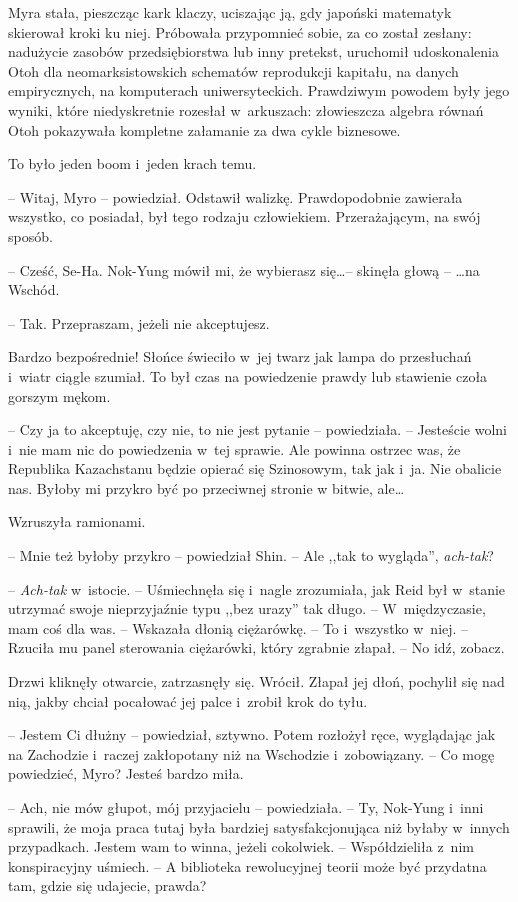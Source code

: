 \documentclass[oneside,polish,11pt,sfheadings]{mwbk}
\begin{document}
Myra stała, pieszcząc kark klaczy, uciszając ją, gdy japoński matematyk
skierował kroki ku niej. Próbowała przypomnieć sobie, za co został
zesłany: nadużycie zasobów przedsiębiorstwa lub inny pretekst, uruchomił
udoskonalenia Otoh dla neomarksistowskich schematów reprodukcji
kapitału, na danych empirycznych, na komputerach uniwersyteckich.
Prawdziwym powodem były jego wyniki, które niedyskretnie rozesłał w~arkuszach: złowieszcza algebra równań Otoh pokazywała kompletne
załamanie za dwa cykle biznesowe.

To było jeden boom i~jeden krach temu.

-- Witaj, Myro -- powiedział. Odstawił walizkę. Prawdopodobnie zawierała
wszystko, co posiadał, był tego rodzaju człowiekiem. Przerażającym, na
swój sposób.

-- Cześć, Se-Ha. Nok-Yung mówił mi, że wybierasz się\ldots -- skinęła głową -- \ldots na Wschód.

-- Tak. Przepraszam, jeżeli nie akceptujesz.

Bardzo bezpośrednie! Słońce świeciło w~jej twarz jak lampa do
przesłuchań i~wiatr ciągle szumiał. To był czas na powiedzenie prawdy
lub stawienie czoła gorszym mękom.

-- Czy ja to akceptuję, czy nie, to nie jest pytanie -- powiedziała. -- Jesteście wolni i~nie mam nic do powiedzenia w~tej sprawie. Ale powinna
ostrzec was, że Republika Kazachstanu będzie opierać się Szinosowym, tak
jak i~ja. Nie obalicie nas. Byłoby mi przykro być po przeciwnej stronie
w bitwie, ale\ldots

Wzruszyła ramionami.

-- Mnie też byłoby przykro -- powiedział Shin. -- Ale ,,tak to wygląda'',
\textit{ach-tak}?

-- \textit{Ach-tak} w~istocie. -- Uśmiechnęła się i~nagle zrozumiała, jak
Reid był w~stanie utrzymać swoje nieprzyjaźnie typu ,,bez urazy'' tak
długo. -- W~międzyczasie, mam coś dla was. -- Wskazała dłonią ciężarówkę.
-- To i~wszystko w~niej. -- Rzuciła mu panel sterowania ciężarówki, który
zgrabnie złapał. -- No idź, zobacz.

Drzwi kliknęły otwarcie, zatrzasnęły się. Wrócił. Złapał jej dłoń,
pochylił się nad nią, jakby chciał pocałować jej palce i~zrobił krok do
tyłu.

-- Jestem Ci dłużny -- powiedział, sztywno. Potem rozłożył ręce,
wyglądając jak na Zachodzie i~raczej zakłopotany niż na Wschodzie i~zobowiązany. -- Co mogę powiedzieć, Myro? Jesteś bardzo miła.

-- Ach, nie mów głupot, mój przyjacielu -- powiedziała. -- Ty, Nok-Yung i~inni sprawili, że moja praca tutaj była bardziej satysfakcjonująca niż
byłaby w~innych przypadkach. Jestem wam to winna, jeżeli cokolwiek. -- Współdzieliła z~nim konspiracyjny uśmiech. -- A biblioteka rewolucyjnej
teorii może być przydatna tam, gdzie się udajecie, prawda?
\end{document}
